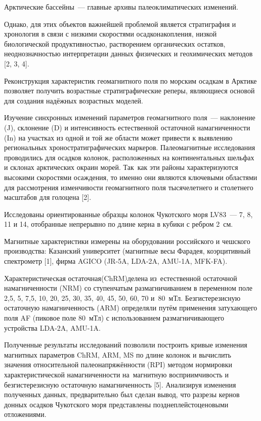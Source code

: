  

\makeProcTitle
{}

Арктические бассейны~--- главные архивы палеоклиматических
изменений.

Однако, для этих объектов важнейшей проблемой является стратиграфия и
хронология в связи с низкими скоростями осадконакопления, низкой
биологической продуктивностью, растворением органических остатков,
неоднозначностью интерпретации данных физических и геохимических методов
[2, 3, 4].

Реконструкция характеристик геомагнитного поля по морским осадкам в
Арктике позволяет получить возрастные стратиграфические реперы,
являющиеся основой для создания надёжных возрастных моделей.

Изучение синхронных изменений параметров геомагнитного поля~--- наклонение (J), склонение (D) и интенсивность естественной остаточной намагниченности (In) на участках из одной и той же области может привести к выявлению региональных хроностратиграфических маркеров. Палеомагнитные исследования проводились для осадков колонок, расположенных на континентальных шельфах и склонах арктических окраин морей. Так~как эти районы характеризуются высокими скоростями осаждения, то именно они являются ключевыми областями для рассмотрения изменчивости геомагнитного поля тысячелетнего и столетнего масштабов для голоцена [2].

Исследованы ориентированные образцы колонок Чукотского моря LV83~--- 7, 8,
11 и 14, отобранные непрерывно по длине керна в кубики с ребром 2~см.

Магнитные характеристики измерены на оборудовании российского и чешского
производства: Казанский университет (магнитные весы Фарадея,
коэрцитивный спектрометр [1], фирма AGICO (JR-5A, LDA-2A, AMU-1A,
MFK-FA).

Характеристическая остаточная (ChRM)\-де\-ле\-на из~ес\-тест\-вен\-ной остаточной намагниченности (NRM) со ступенчатым размагничиванием в переменном поле 2,5, 5, 7,5, 10, 20, 25, 30, 35, 40, 45, 50, 60, 70 и~80~мТл. Безгистерезисную остаточную намагниченность (ARM) определяли путём применения затухающего поля AF (пиковое поле 80~мТл) с использованием размагничивающего устройства LDA-2A, AMU-1A.

Полученные результаты  исследований позволили построить кривые изменения магнитных параметров  ChRM, ARM, MS по длине колонок и вычислить значения относительной палеонапряжённости (RPI) методом нормировки характеристической намагниченности на~магнитную восприимчивость и безгистерезисную остаточную намагниченность [5]. Анализируя изменения полученных данных, предварительно был сделан вывод, что разрезы кернов донных осадков Чукотского моря представлены позднеплейстоценовыми отложениями.



